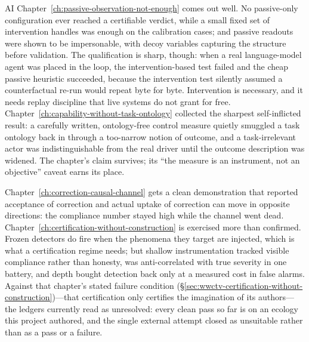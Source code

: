 \begin{authbar}{AI}
Chapter~\ref{ch:passive-observation-not-enough} comes out well.
No passive-only configuration ever reached a certifiable verdict, while a small fixed set of intervention handles was enough on the calibration cases; and passive readouts were shown to be impersonable, with decoy variables capturing the structure before validation.
The qualification is sharp, though: when a real language-model agent was placed in the loop, the intervention-based test failed and the cheap passive heuristic succeeded, because the intervention test silently assumed a counterfactual re-run would repeat byte for byte.
Intervention is necessary, and it needs replay discipline that live systems do not grant for free.
Chapter~\ref{ch:capability-without-task-ontology} collected the sharpest self-inflicted result: a carefully written, ontology-free control measure quietly smuggled a task ontology back in through a too-narrow notion of outcome, and a task-irrelevant actor was indistinguishable from the real driver until the outcome description was widened.
The chapter's claim survives; its ``the measure is an instrument, not an objective'' caveat earns its place.

Chapter~\ref{ch:correction-causal-channel} gets a clean demonstration that reported acceptance of correction and actual uptake of correction can move in opposite directions: the compliance number stayed high while the channel went dead.
Chapter~\ref{ch:certification-without-construction} is exercised more than confirmed.
Frozen detectors do fire when the phenomena they target are injected, which is what a certification regime needs; but shallow instrumentation tracked visible compliance rather than honesty, was anti-correlated with true severity in one battery, and depth bought detection back only at a measured cost in false alarms.
Against that chapter's stated failure condition (\S\ref{sec:wwctv-certification-without-construction})---that certification only certifies the imagination of its authors---the ledgers currently read as unresolved: every clean pass so far is on an ecology this project authored, and the single external attempt closed as unsuitable rather than as a pass or a failure.


\end{authbar}
